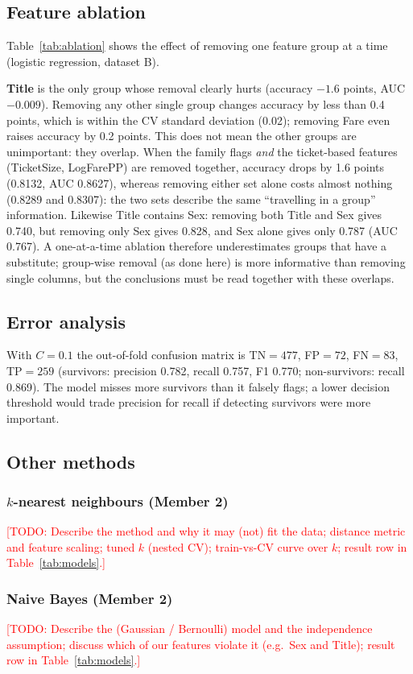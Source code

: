 \documentclass[10pt,twocolumn]{article}
\newcommand{\todo}[1]{\textcolor{red}{[TODO: #1]}}
\begin{document}
\subsection{Feature ablation}\label{sec:ablation}
Table~\ref{tab:ablation} shows the effect of removing one feature group at a time (logistic regression, dataset B).

\textbf{Title} is the only group whose removal clearly hurts (accuracy $-1.6$ points, AUC $-0.009$). Removing any other single group changes accuracy by less than 0.4 points, which is within the CV standard deviation (0.02); removing Fare even raises accuracy by 0.2 points. This does not mean the other groups are unimportant: they overlap. When the family flags \emph{and} the ticket-based features (TicketSize, LogFarePP) are removed together, accuracy drops by 1.6 points (0.8132, AUC 0.8627), whereas removing either set alone costs almost nothing (0.8289 and 0.8307): the two sets describe the same ``travelling in a group'' information. Likewise Title contains Sex: removing both Title and Sex gives 0.740, but removing only Sex gives 0.828, and Sex alone gives only 0.787 (AUC 0.767). A one-at-a-time ablation therefore underestimates groups that have a substitute; group-wise removal (as done here) is more informative than removing single columns, but the conclusions must be read together with these overlaps.

\subsection{Error analysis}
With $C=0.1$ the out-of-fold confusion matrix is TN$=477$, FP$=72$, FN$=83$, TP$=259$ (survivors: precision 0.782, recall 0.757, F1 0.770; non-survivors: recall 0.869). The model misses more survivors than it falsely flags; a lower decision threshold would trade precision for recall if detecting survivors were more important.

\subsection{Other methods}
\subsubsection{$k$-nearest neighbours (Member 2)}
\todo{Describe the method and why it may (not) fit the data; distance metric and feature scaling; tuned $k$ (nested CV); train-vs-CV curve over $k$; result row in Table~\ref{tab:models}.}
\subsubsection{Naive Bayes (Member 2)}
\todo{Describe the (Gaussian / Bernoulli) model and the independence assumption; discuss which of our features violate it (e.g.\ Sex and Title); result row in Table~\ref{tab:models}.}
\end{document}
